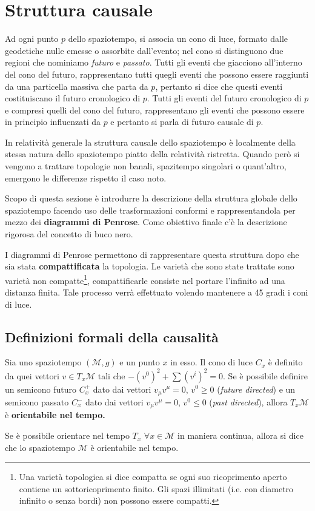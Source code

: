 \chapter{Struttura causale}
Ad ogni punto $p$ dello spaziotempo, si associa un cono di luce, formato dalle geodetiche nulle emesse o assorbite dall'evento; nel cono si distinguono due regioni che nominiamo \emph{futuro} e \emph{passato}. Tutti gli eventi che giacciono all'interno del cono del futuro, rappresentano tutti quegli eventi che possono essere raggiunti da una particella massiva che parta da $p$, pertanto si dice che questi eventi costituiscano il futuro cronologico di $p$. Tutti gli eventi del futuro cronologico di $p$ e compresi quelli del cono del futuro, rappresentano gli eventi che possono essere in principio influenzati da $p$ e pertanto si parla di futuro causale di $p$.

In relatività generale la struttura causale dello spaziotempo è localmente della stessa natura dello spaziotempo piatto della relatività ristretta. Quando però si vengono a trattare topologie non banali, spazitempo singolari o quant'altro, emergono le differenze rispetto il caso noto.

Scopo di questa sezione è introdurre la descrizione della struttura globale dello spaziotempo facendo uso delle trasformazioni conformi e rappresentandola per mezzo dei \textbf{diagrammi di Penrose}. Come obiettivo finale c'è la descrizione rigorosa del concetto di buco nero.

I diagrammi di Penrose permettono di rappresentare questa struttura dopo che sia stata \textbf{compattificata} la topologia. Le varietà che sono state trattate sono varietà non compatte\footnote{Una varietà topologica si dice compatta se ogni suo ricoprimento aperto contiene un sottoricoprimento finito. Gli spazi illimitati (i.e. con diametro infinito o senza bordi) non possono essere compatti.}, compattificarle consiste nel portare l'infinito ad una distanza finita. Tale processo verrà effettuato volendo mantenere a 45 gradi i coni di luce.

\section{Definizioni formali della causalità}
\begin{definizione}
 Sia uno spaziotempo $(\mathcal{M},g)$ e un punto $x$ in esso. Il cono di luce $C_x$ è definito da quei vettori $v \in T_x\mathcal{M}$ tali che $-(v^0)^2 + \sum (v^i)^2 = 0$. Se è possibile definire un semicono futuro $C^+_x$ dato dai vettori $v_\mu v^\mu =0$, $v^0 \geq 0$ (\textit{future directed}) e un semicono passato $C^-_x$ dato dai vettori $v_\mu v^\mu = 0$, $v^0 \leq 0$ (\textit{past directed}), allora $T_x\mathcal{M}$ è \textbf{orientabile nel tempo.}

Se è possibile orientare nel tempo $T_x$  $\forall x \in \mathcal{M}$ in maniera continua, allora si dice che lo spaziotempo $\mathcal{M}$ è orientabile nel tempo.
\end{definizione}

